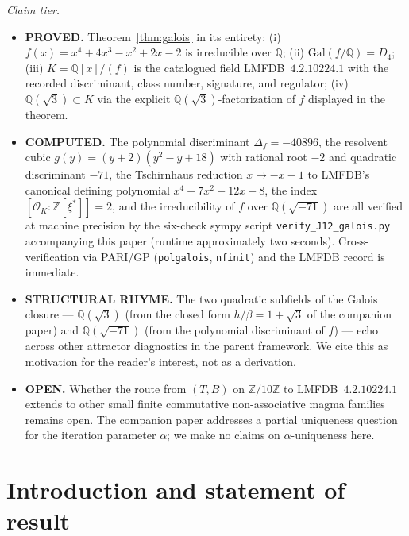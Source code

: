 \documentclass[11pt,reqno]{amsart}
\theoremstyle{plain}
\theoremstyle{definition}
\theoremstyle{remark}
\newcommand{\Q}{\mathbb{Q}}
\newcommand{\Z}{\mathbb{Z}}
\newcommand{\TS}{T}
\newcommand{\BH}{B}
\begin{document}
\medskip
\noindent\textit{Claim tier.}
\begin{itemize}\setlength\itemsep{0pt}
\item \textbf{PROVED.} Theorem~\ref{thm:galois} in its entirety: (i)
  $f(x) = x^{4} + 4x^{3} - x^{2} + 2x - 2$ is irreducible over $\Q$;
  (ii) $\mathrm{Gal}(f/\Q) = D_{4}$; (iii) $K = \Q[x]/(f)$ is the
  catalogued field LMFDB~$4.2.10224.1$ with the recorded discriminant,
  class number, signature, and regulator; (iv) $\Q(\sqrt{3}) \subset K$
  via the explicit $\Q(\sqrt{3})$-factorization of $f$ displayed in the
  theorem.

\item \textbf{COMPUTED.} The polynomial discriminant
  $\Delta_{f} = -40896$, the resolvent cubic
  $g(y) = (y+2)(y^{2} - y + 18)$ with rational root $-2$ and quadratic
  discriminant $-71$, the Tschirnhaus reduction
  $x \mapsto -x - 1$ to LMFDB's canonical defining polynomial
  $x^{4} - 7x^{2} - 12x - 8$, the index $[\mathcal{O}_{K} :
  \Z[\xi^{*}]] = 2$, and the irreducibility of $f$ over $\Q(\sqrt{-71})$
  are all verified at machine precision by the six-check sympy script
  \texttt{verify\_J12\_galois.py} accompanying this paper (runtime
  approximately two seconds). Cross-verification via PARI/GP
  (\texttt{polgalois}, \texttt{nfinit}) and the LMFDB record is
  immediate.

\item \textbf{STRUCTURAL RHYME.} The two quadratic subfields of the
  Galois closure --- $\Q(\sqrt{3})$ (from the closed form
  $h/\beta = 1+\sqrt{3}$ of the companion paper) and $\Q(\sqrt{-71})$
  (from the polynomial discriminant of $f$) --- echo across other
  attractor diagnostics in the parent framework. We cite this as
  motivation for the reader's interest, not as a derivation.

\item \textbf{OPEN.} Whether the route from $(\TS, \BH)$ on $\Z/10\Z$
  to LMFDB~$4.2.10224.1$ extends to other small finite commutative
  non-associative magma families remains open. The companion paper
  \cite{SandersGishFourCore} addresses a partial uniqueness question
  for the iteration parameter $\alpha$; we make no claims on
  $\alpha$-uniqueness here.
\end{itemize}

\section{Introduction and statement of result}
\end{document}
